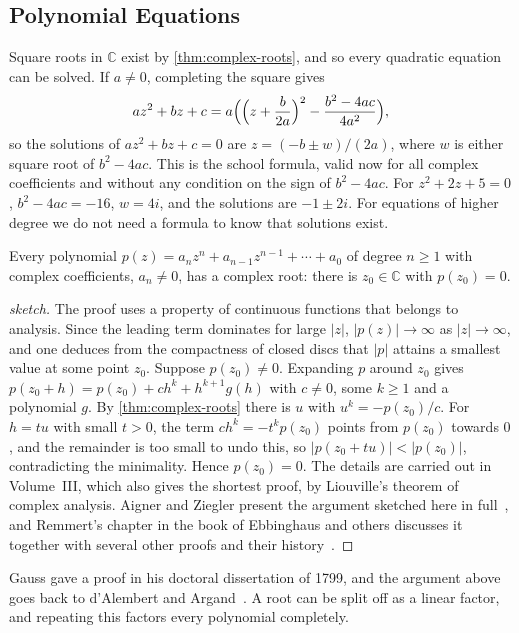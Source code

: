 \subsection{Polynomial Equations}

Square roots in $\mathbb C$ exist by \cref{thm:complex-roots}, and so every quadratic equation can be solved. If $a\ne0$, completing the square gives
\[
az^2+bz+c=a\Bigl(\Bigl(z+\frac b{2a}\Bigr)^2-\frac{b^2-4ac}{4a^2}\Bigr),
\]
so the solutions of $az^2+bz+c=0$ are $z=(-b\pm w)/(2a)$, where $w$ is either square root of $b^2-4ac$. This is the school formula, valid now for all complex coefficients and without any condition on the sign of $b^2-4ac$. For $z^2+2z+5=0$, $b^2-4ac=-16$, $w=4i$, and the solutions are $-1\pm2i$. For equations of higher degree we do not need a formula to know that solutions exist.

\begin{theorem}
\label{thm:fta}
Every polynomial $p(z)=a_nz^n+a_{n-1}z^{n-1}+\cdots+a_0$ of degree $n\ge1$ with complex coefficients, $a_n\ne0$, has a complex root: there is $z_0\in\mathbb C$ with $p(z_0)=0$.
\end{theorem}

\begin{proof}[sketch]
The proof uses a property of continuous functions that belongs to analysis. Since the leading term dominates for large $|z|$, $|p(z)|\to\infty$ as $|z|\to\infty$, and one deduces from the compactness of closed discs that $|p|$ attains a smallest value at some point $z_0$. Suppose $p(z_0)\ne0$. Expanding $p$ around $z_0$ gives $p(z_0+h)=p(z_0)+ch^k+h^{k+1}g(h)$ with $c\ne0$, some $k\ge1$ and a polynomial $g$. By \cref{thm:complex-roots} there is $u$ with $u^k=-p(z_0)/c$. For $h=tu$ with small $t>0$, the term $ch^k=-t^kp(z_0)$ points from $p(z_0)$ towards $0$, and the remainder is too small to undo this, so $|p(z_0+tu)|<|p(z_0)|$, contradicting the minimality. Hence $p(z_0)=0$. The details are carried out in Volume~III, which also gives the shortest proof, by Liouville's theorem of complex analysis. Aigner and Ziegler present the argument sketched here in full~\cite{aigner2018proofs}, and Remmert's chapter in the book of Ebbinghaus and others discusses it together with several other proofs and their history~\cite{ebbinghaus1991}.
\end{proof}

Gauss gave a proof in his doctoral dissertation of 1799, and the argument above goes back to d'Alembert and Argand~\cite{ebbinghaus1991}. A root can be split off as a linear factor, and repeating this factors every polynomial completely.


